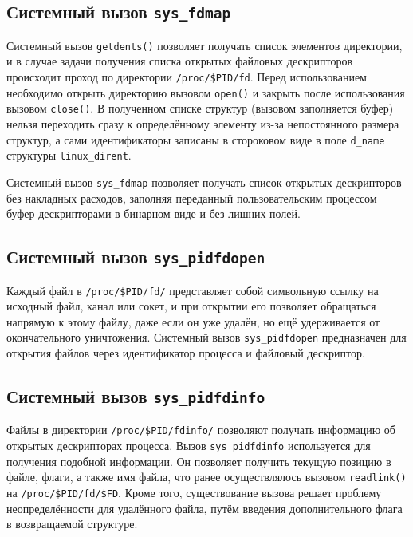 \subsection{Системный вызов \texttt{sys\_fdmap}}
\label{sub:sys:sys_fdmap}

Системный вызов \texttt{getdents()} позволяет получать список элементов
директории, и в случае задачи получения списка открытых файловых
дескрипторов происходит проход по директории \texttt{/proc/\$PID/fd}. Перед
использованием необходимо открыть директорию вызовом \texttt{open()} и закрыть
после использования вызовом \texttt{close()}. В полученном списке структур
(вызовом заполняется буфер) нельзя переходить сразу к определённому элементу
из-за непостоянного размера структур, а сами идентификаторы записаны в
стороковом виде в поле \texttt{d\_name} структуры \texttt{linux\_dirent}.

Системный вызов \texttt{sys\_fdmap} позволяет получать список открытых
дескрипторов без накладных расходов, заполняя переданный пользовательским
процессом буфер дескрипторами в бинарном виде и без лишних полей.

\subsection{Системный вызов \texttt{sys\_pidfdopen}}
\label{sub:sys:sys_pidfdopen}

Каждый файл в \texttt{/proc/\$PID/fd/} представляет собой символьную ссылку на
исходный файл, канал или сокет, и при открытии его позволяет обращаться напрямую
к этому файлу, даже если он уже удалён, но ещё удерживается от окончательного
уничтожения. Системный вызов \texttt{sys\_pidfdopen} предназначен для открытия
файлов через идентификатор процесса и файловый дескриптор. 

\subsection{Системный вызов \texttt{sys\_pidfdinfo}}
\label{sub:sys:sys_pidfdinfo}

Файлы в директории \texttt{/proc/\$PID/fdinfo/} позволяют получать информацию
об открытых дескрипторах процесса. Вызов
\texttt{sys\_pidfdinfo} используется для получения подобной информации. Он
позволяет получить текущую позицию в файле, флаги, а также имя файла, что ранее
осуществлялось вызовом \texttt{readlink()} на \texttt{/proc/\$PID/fd/\$FD}.
Кроме того, существование вызова решает проблему неопределённости для удалённого
файла, путём введения дополнительного флага в возвращаемой структуре.

